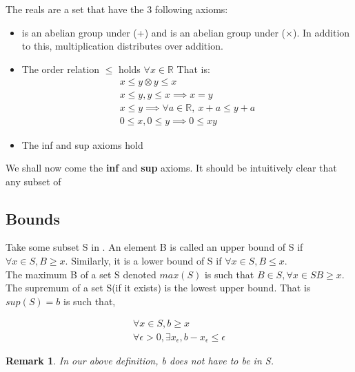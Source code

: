 \documentclass{article}
\newtheorem{remark}{Remark}[section]
\numberwithin{equation}{subsection}
\begin{document}
\begin{tcolorbox}
The reals are a set that have the 3 following axioms:
\begin{itemize}
    \item {} is an abelian group under (+) and  is an abelian group under ($\times$). In addition to this, multiplication distributes over addition.
    \item The order relation $\leq$ holds $\forall x \in \mathbb{R}$ That is:
    \begin{align*}
        x \leq y \otimes y \leq x\\
        x \leq y, y \leq x \implies x = y\\
        x \leq y \implies \forall a \in \mathbb{R},\  x + a \leq y + a\\
        0 \leq x, 0 \leq y \implies 0 \leq xy
    \end{align*}
    \item The inf and sup axioms hold
\end{itemize}

We shall now come the \textbf{inf} and \textbf{sup} axioms. It should be intuitively clear that any subset of  
\end{tcolorbox}

\subsection{Bounds}
Take some subset S in . An element B is called an upper bound of S if $\forall x \in S, B \geq x$. Similarly, it is a lower bound of S if $\forall x \in S, B \leq x$.
\\
The maximum B of a set S denoted $max(S)$ is such that $B \in S, \forall x \in S B \geq x$. 
\\
The supremum of a set S(if it exists) is the lowest upper bound. That is $sup(S) = b$ is such that,


    \begin{align}
        \forall x \in S, b \geq x\\
        \forall \epsilon > 0, \exists x_{\epsilon}, b - x_{\epsilon} \leq \epsilon
    \end{align}
    
    
    
    
    
\begin{remark}

   In our above definition, b does not have to be in S.

\end{remark}
\end{document}
